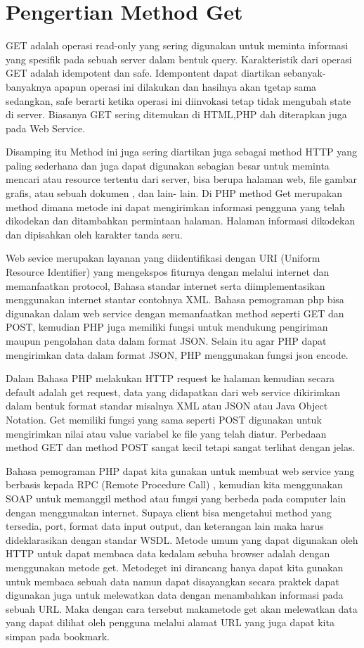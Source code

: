 \section{Pengertian Method Get}
GET adalah operasi read-only yang sering digunakan untuk meminta informasi yang spesifik pada sebuah server dalam bentuk query. 
Karakteristik dari operasi GET adalah idempotent dan safe. Idempontent dapat diartikan sebanyak-banyaknya apapun operasi ini dilakukan 
dan hasilnya akan tgetap sama sedangkan, safe berarti ketika operasi ini diinvokasi tetap tidak mengubah state di server.
Biasanya GET sering ditemukan di HTML,PHP dah diterapkan juga pada Web Service.

Disamping itu Method ini juga sering diartikan juga sebagai method HTTP yang paling sederhana dan juga dapat digunakan sebagian besar 
untuk meminta mencari atau resource tertentu dari server, bisa berupa halaman web, file gambar grafis, atau sebuah dokumen , dan lain-
lain.  Di PHP method Get merupakan method dimana metode ini dapat mengirimkan informasi pengguna yang telah dikodekan dan ditambahkan 
permintaan halaman. Halaman informasi dikodekan dan dipisahkan oleh karakter tanda seru.

Web sevice merupakan layanan yang diidentifikasi dengan URI (Uniform Resource Identifier) yang mengekspos fiturnya dengan melalui 
internet dan memanfaatkan protocol, Bahasa standar internet  serta diimplementasikan menggunakan internet stantar contohnya XML. Bahasa 
pemograman php bisa digunakan dalam web service dengan memanfaatkan method seperti GET dan POST, kemudian PHP juga memiliki fungsi 
untuk mendukung pengiriman maupun pengolahan data dalam format JSON. Selain itu  agar PHP dapat mengirimkan data dalam format JSON, PHP 
menggunakan fungsi json encode.  

Dalam Bahasa PHP melakukan HTTP request ke halaman kemudian secara default adalah get request, data yang didapatkan dari web service 
dikirimkan dalam bentuk format standar misalnya XML atau JSON atau Java Object Notation. Get memiliki fungsi yang sama seperti POST 
digunakan untuk mengirimkan nilai atau value variabel ke file yang telah diatur. Perbedaan method GET dan method POST sangat kecil 
tetapi sangat terlihat dengan jelas.

Bahasa pemograman PHP dapat kita gunakan untuk membuat web service yang  berbasis kepada RPC (Remote Procedure Call) , kemudian kita 
menggunakan SOAP untuk memanggil method atau fungsi yang berbeda pada computer lain dengan menggunakan internet. Supaya client bisa 
mengetahui method yang tersedia, port, format data input output, dan keterangan lain maka harus  dideklarasikan dengan standar WSDL.    
Metode umum yang dapat digunakan oleh HTTP untuk dapat membaca data kedalam sebuha browser adalah dengan menggunakan metode get. 
Metodeget ini dirancang hanya dapat kita gunakan untuk membaca sebuah data namun dapat disayangkan secara praktek dapat digunakan juga untuk melewatkan data dengan menambahkan informasi pada sebuah URL. Maka dengan cara tersebut makametode get akan melewatkan data yang dapat dilihat oleh pengguna melalui alamat URL yang juga dapat kita simpan pada bookmark.

